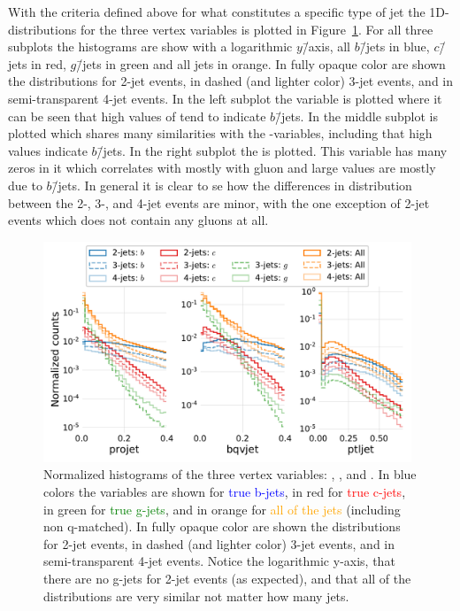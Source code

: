 With the criteria defined above for what constitutes a specific type of jet the 1D-distributions for the three vertex variables is plotted in Figure~\ref{fig:q:vertex_variables}. For all three subplots the histograms are show with a logarithmic $y$\=/axis, all $b$\=/jets in blue, $c$\=/jets in red, $g$\=/jets in green and all jets in orange. In fully opaque color are shown the distributions for 2-jet events, in dashed (and lighter color) 3-jet events, and in semi-transparent 4-jet events. In the left subplot the  variable is plotted where it can be seen that high values of  tend to indicate $b$\=/jets. In the middle subplot  is plotted which shares many similarities with the -variables, including that high values indicate $b$\=/jets. In the right subplot the  is plotted. This variable has many zeros in it which correlates with mostly with gluon and large values are mostly due to $b$\=/jets. In general it is clear to se how the differences in distribution between the \num{2}-, \num{3}-, and \num{4}-jet events are minor, with the one exception of \num{2}-jet events which does not contain any gluons at all. 

\begin{figure}
  \includegraphics[width=0.98\textwidth, trim=0 0 0 0, clip]{figures/quarks/btagging_variables_hist-down_sample=1.00-ML_vars=vertex-selection=b-ejet_min=4-n_iter_RS_lgb=99-n_iter_RS_xgb=9-cdot_cut=0.90-version=19.pdf}
  \caption[Histograms of the vertex variables]
          {Normalized histograms of the three vertex variables: , , and . In blue colors the variables are shown for \textcolor{blue}{true b-jets}, in red for \textcolor{red}{true c-jets}, in green for \textcolor{green}{true g-jets}, and in orange for \textcolor{orange}{all of the jets} (including non q-matched). In fully opaque color are shown the distributions for 2-jet events, in dashed (and lighter color) 3-jet events, and in semi-transparent 4-jet events. Notice the logarithmic y-axis, that there are no g-jets for 2-jet events (as expected), and that all of the distributions are very similar not matter how many jets.
          } 
  \label{fig:q:vertex_variables}
\end{figure}

